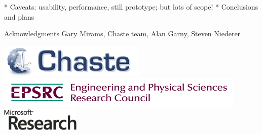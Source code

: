 \documentclass[t,xcolor={usenames,dvipsnames}]{beamer}
\begin{document}
\begin{frame}{}
 * Caveats: usability, performance, still prototype; but lots of scope!
 * Conclusions and plans
\end{frame}

\begin{frame}{Acknowledgments}
Gary Mirams, Chaste team, Alan Garny, Steven Niederer

\begin{center}
\includegraphics[scale=.9]{chaste-266x60}\\ \vspace{.4cm}
\includegraphics[width=.55\textwidth]{EPSRC1RGBLO} \hspace{.1cm}
\includegraphics[scale=.55]{logo_msr}
\end{center}
\end{frame}
\end{document}
